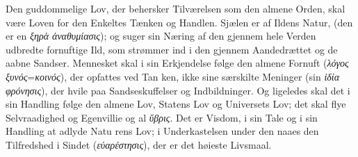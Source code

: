 \documentclass[12pt,a4paper]{book}
\newcommand{\gk}[1]{\textit{#1}}
\begin{document}
Den guddommelige Lov, der behersker Tilværelsen som den
almene Orden, skal være Loven for den Enkeltes Tænken og
Handlen. Sjælen er af Ildens Natur, (den er en \gk{ξηρὰ ἀναθυμίασις});
og suger sin Næring af den gjennem hele Verden udbredte
fornuftige Ild, som strømmer ind i den gjennem Aandedrættet
og de aabne Sandser. Mennesket skal i sin Erkjendelse følge
den almene Fornuft (\gk{λόγος ξυνός}=\gk{κοινός}), der opfattes ved Tan\-%
ken, ikke sine særskilte Meninger (sin \gk{ἰδία φρόνησις}), der hvile
paa Sandseskuffelser og Indbildninger. Og ligeledes skal det i
sin Handling følge den almene Lov, Statens Lov og Universets
Lov; det skal flye Selvraadighed og Egenvillie og al \gk{ὕβρις}.
%
%
%
%
Det er Visdom, i sin Tale og i sin Handling at adlyde Natu\-%
rens Lov; i Underkastelsen under den naaes den Tilfredshed i
Sindet (\gk{εὐαρέστησις}), der er det høieste Livsmaal.
\end{document}
